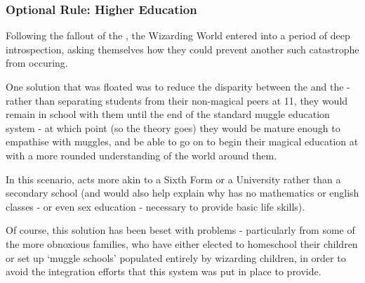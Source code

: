 \subsubsection{Optional Rule: Higher Education}

Following the fallout of the , the Wizarding World entered into a period of deep introspection, asking themselves how they could prevent another such catastrophe from occuring. 

One solution that was floated was to reduce the disparity between the  and the  - rather than separating students from their non-magical peers at 11, they would remain in school with them until the end of the standard muggle education system - at which point (so the theory goes) they would be mature enough to empathise with muggles, and be able to go on to begin their magical education at  with a more rounded understanding of the world around them. 

In this scenario,  acts more akin to a Sixth Form or a University rather than a secondary school (and would also help explain why  has no mathematics or english classes - or even sex education - necessary to provide basic life skills).

Of course, this solution has been beset with problems - particularly from some of the more obnoxious  families, who have either elected to homeschool their children or set up `muggle schools' populated entirely by wizarding children, in order to avoid the integration efforts that this system was put in place to provide. 

\newcommand\building[3]
{
	\subsection{#1}
	
	#2
	
	#3

}
\newcommand\floor[2]
{
	\subsubsection{#1}
	
	#2
}

\newcommand\location[2]
{
	\key{#1}
	
	#2

}


